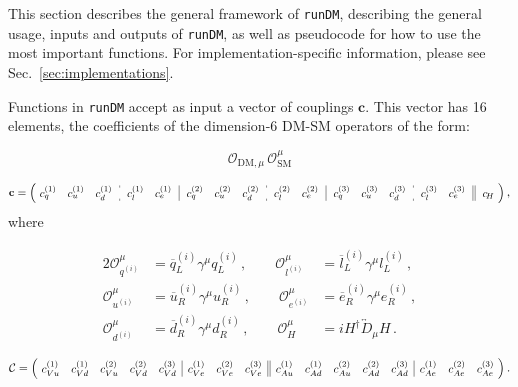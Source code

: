 \documentclass[notitlepage,12pt]{article}
\newcommand{\runDM}{\texttt{runDM}\xspace}
\newcommand\scalemath[2]{\scalebox{#1}{\mbox{\ensuremath{\displaystyle #2}}}}
\begin{document}
This section describes the general framework of \runDM, describing the general usage, inputs and outputs of \runDM, as well as pseudocode for how to use the most important functions. For implementation-specific information, please see Sec.~\ref{sec:implementations}.

Functions in \runDM accept as input a vector of couplings $\mathbf{c}$. This vector has 16 elements, the coefficients of the dimension-6 DM-SM operators of the form:

\begin{equation}
\mathcal{O}_{\mathrm{DM},\mu} \, \mathcal{O}_\mathrm{SM}^\mu
\end{equation}

\begin{equation}
\scalemath{0.9}{\mathbf{c} = \left(\!\begin{array}{ccc:cc|ccc:cc|ccc:cc||c}
c_{ q}^{(1)} & c_{u}^{(1)} & c_{ d}^{(1)}\,&\, c_{ l}^{(1)} & c_{ e}^{(1)} \,&\, 
c_{ q}^{(2)} & c_{ u}^{(2)} & c_{ d}^{(2)} \,&\, c_{ l}^{(2)} & c_{ e}^{(2)} \,&\,
c_{ q}^{(3)} & c_{ u}^{(3)} & c_{ d}^{(3)} \,&\, c_{ l}^{(3)} & c_{ e}^{(3)} \,&\,
c_{ \!H} \end{array}\!\right)}\,,
\label{eq:cdef}
\end{equation}
where

\begin{alignat}{2}
\mathcal{O}_{q^{(i)}}^\mu &= \overline{q}^{(i)}_L \gamma^\mu q^{(i)}_L \,, \qquad \mathcal{O}_{l^{(i)}}^\mu   &= \overline{l}^{(i)}_L \gamma^\mu l^{(i)}_L\,, \nonumber \\
\mathcal{O}_{u^{(i)}}^\mu &= \overline{u}^{(i)}_R \gamma^\mu u^{(i)}_R\,, \qquad \mathcal{O}_{e^{(i)}}^\mu &= \overline{e}^{(i)}_R \gamma^\mu e^{(i)}_R \,, \\
\mathcal{O}_{d^{(i)}}^\mu &= \overline{d}^{(i)}_R \gamma^\mu d^{(i)}_R\,, \qquad\mathcal{O}_H^\mu &= i H^\dagger \overleftrightarrow{D}_\mu H\,. \nonumber
\end{alignat}

\begin{align}
\scalemath{0.9}{\mathcal{C} = \left(\!\begin{array}{ccccc|ccc||ccccc|ccc}
c_{ Vu}^{(1)} & c_{ Vd}^{(1)} & c_{ Vu}^{(2)} & c_{ Vd}^{(2)} & c_{ Vd}^{(3)} & 
c_{ Ve}^{(1)} &c_{ Ve}^{(2)}  & c_{ Ve}^{(3)}  & c_{ Au}^{(1)} & c_{ Ad}^{(1)} & c_{ Au}^{(2)} & c_{ Ad}^{(2)} & c_{ Ad}^{(3)} & 
c_{ Ae}^{(1)} &c_{ Ae}^{(2)}  & c_{ Ae}^{(3)} \end{array}\!\right) }\,.
\label{eq:cdef2}
\end{align}
\end{document}
